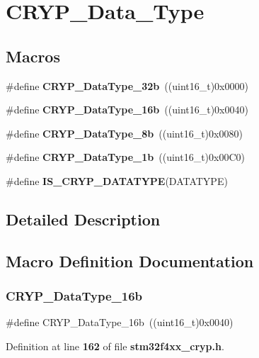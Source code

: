 \section{C\+R\+Y\+P\+\_\+\+Data\+\_\+\+Type}
\label{group__CRYP__Data__Type}
\subsection*{Macros}
\begin{DoxyCompactItemize}
\item 
\#define \textbf{ C\+R\+Y\+P\+\_\+\+Data\+Type\+\_\+32b}~((uint16\+\_\+t)0x0000)
\item 
\#define \textbf{ C\+R\+Y\+P\+\_\+\+Data\+Type\+\_\+16b}~((uint16\+\_\+t)0x0040)
\item 
\#define \textbf{ C\+R\+Y\+P\+\_\+\+Data\+Type\+\_\+8b}~((uint16\+\_\+t)0x0080)
\item 
\#define \textbf{ C\+R\+Y\+P\+\_\+\+Data\+Type\+\_\+1b}~((uint16\+\_\+t)0x00\+C0)
\item 
\#define \textbf{ I\+S\+\_\+\+C\+R\+Y\+P\+\_\+\+D\+A\+T\+A\+T\+Y\+PE}(D\+A\+T\+A\+T\+Y\+PE)
\end{DoxyCompactItemize}


\subsection{Detailed Description}


\subsection{Macro Definition Documentation}
\mbox{\label{group__CRYP__Data__Type_ga6af3c4d9f6f8c2b8cbf86c640fd053a7}} 
\subsubsection{C\+R\+Y\+P\+\_\+\+Data\+Type\+\_\+16b}
{\footnotesize\ttfamily \#define C\+R\+Y\+P\+\_\+\+Data\+Type\+\_\+16b~((uint16\+\_\+t)0x0040)}



Definition at line \textbf{ 162} of file \textbf{ stm32f4xx\+\_\+cryp.\+h}.

